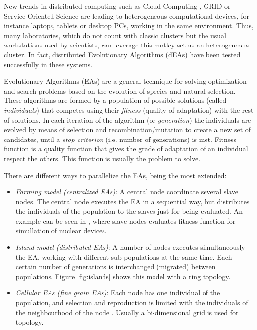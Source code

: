 New trends in distributed computing such as Cloud Computing \cite{CLOUD}, GRID
\cite{OPENSCIENCEGRID} or Service Oriented Science \cite{GLOBUS} are
leading to heterogeneous computational devices,  for instance laptops,
tablets or desktop PCs, working in the same
environment. Thus, many laboratories, which do not count with classic
clusters but the usual workstations used by scientists, can leverage
this motley set as an heterogeneous cluster. In fact, distributed Evolutionary
Algorithms (dEAs) \cite{MULTIKULTI} have been tested successfully in these
systems.  %

Evolutionary Algorithms (EAs) are a general technique for solving optimization and search problems based on the evolution of species and natural selection. These algorithms are formed by a population of possible solutions (called {\em individuals}) that competes using their {\em fitness} (quality of adaptation) with the rest of solutions. In each iteration of the algorithm (or {\em generation}) the individuals are evolved by means of selection and recombination/mutation to create a new set of candidates, until a {\em stop criterion} (i.e. number of generations) is met. Fitness function is a quality function that gives the grade of adaptation of an individual respect the others. This function is usually the problem to solve. 

There are different ways to parallelize the EAs, being the most extended:
\begin{itemize}
\item {\em Farming model (centralized EAs)}: A central node coordinate several slave nodes. The central node executes the EA in a sequential way, but distributes the individuals of the population to the slaves just for being evaluated. An example can be seen in \cite{NUCLEAR}, where slave nodes evaluates fitness function for simullation of nuclear devices.
\item {\em Island model (distributed EAs)}: A number of nodes executes simultaneously the EA, working with different sub-populations at the same time. Each certain number of generations is interchanged (migrated) between populations. Figure \ref{fig:islands} shows this model with a ring topology.
\item {\em Cellular EAs (fine grain EAs)}: Each node has one individual of the population, and selection and reproduction is limited with the individuals of the neighbourhood of the node \cite{CELLULAR}. Usually a bi-dimensional grid is used for topology. 
\end{itemize}

